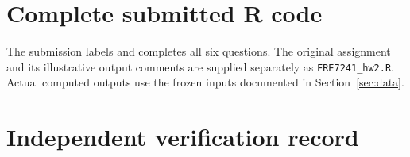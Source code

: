 \documentclass[11pt,letterpaper]{article}
\begin{document}
\clearpage
\appendix
\section{Complete submitted R code}
\label{app:code}
The submission labels and completes all six questions. The original
assignment and its illustrative output comments are supplied separately
as \texttt{FRE7241\_hw2.R}. Actual computed outputs use the frozen inputs
documented in Section~\ref{sec:data}.


\clearpage
\section{Independent verification record}
\label{app:verification}

\end{document}

